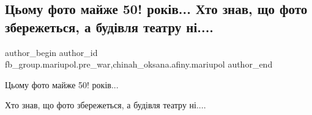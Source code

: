  
 
 
 
 

\subsection{Цьому фото майже 50! років... Хто знав, що фото збережеться, а будівля театру ні....}
\label{sec:24_01_2023.fb.fb_group.mariupol.pre_war.5.tsomu_foto_maizhe_50}
 
\ifcmt
 author_begin
   author_id fb_group.mariupol.pre_war,chinah_oksana.afiny.mariupol
 author_end
\fi

Цьому фото майже 50! років...

Хто знав, що фото збережеться, а будівля театру ні....
